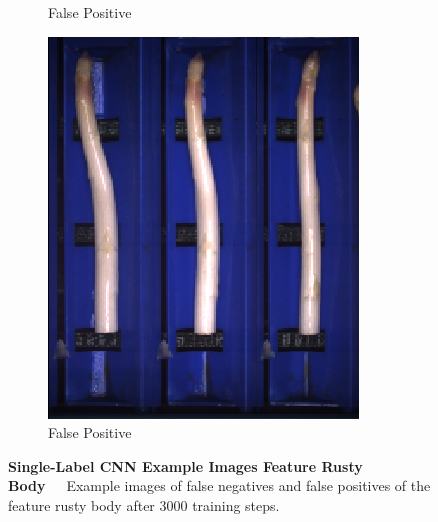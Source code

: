 \begin{figure}[h]
\begin{subfigure}{0.3\textwidth}
		\vspace{-5pt}
		\caption{False Positive}
	\end{subfigure}
	\begin{subfigure}{0.3\textwidth}
		\includegraphics[width=0.9\linewidth]{Figures/appendix/rustybody_falsepositive_03.png}
		\vspace{-5pt}
		\caption{False Positive}
	\end{subfigure}
    \caption[Single-Label CNN Example Images Feature Rusty Body]{\textbf{Single-Label CNN Example Images Feature Rusty Body}~~~Example images of false negatives and false positives of the feature rusty body after 3000 training steps.}
	\vspace{-20pt}
    \label{fig:ExampleImagesRustyBody}
\end{figure}

